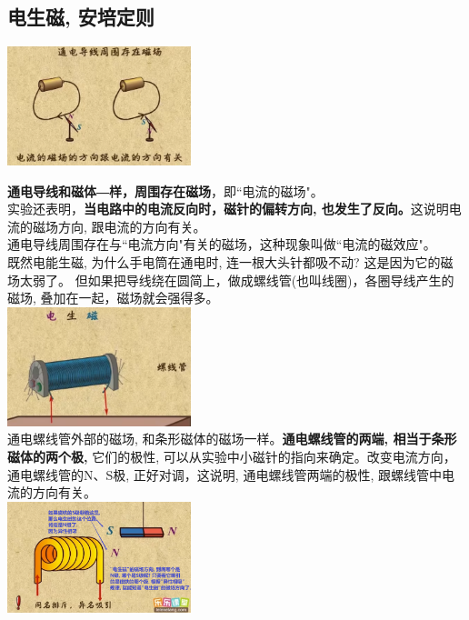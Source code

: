 \documentclass[UTF8]{ctexart}
\begin{document}
\vspace{1em} 

\subsection{电生磁, 安培定则} 

	\includegraphics[width=0.4\textwidth]{img/0081.png} 
	
\textbf{通电导线和磁体―样，周围存在磁场}，即``电流的磁场"。\\
实验还表明，\textbf{当电路中的电流反向时，磁针的偏转方向, 也发生了反向。}这说明电流的磁场方向, 跟电流的方向有关。\\
通电导线周围存在与``电流方向"有关的磁场，这种现象叫做``电流的磁效应"。 \\

既然电能生磁, 为什么手电筒在通电时, 连一根大头针都吸不动? 这是因为它的磁场太弱了。 但如果把导线绕在圆简上，做成螺线管(也叫线圈)，各圈导线产生的磁场, 叠加在一起，磁场就会强得多。 \\
	\includegraphics[width=0.4\textwidth]{img/0082.png}  \\
	

通电螺线管外部的磁场, 和条形磁体的磁场一样。\textbf{通电螺线管的两端, 相当于条形磁体的两个极,} 它们的极性, 可以从实验中小磁针的指向来确定。改变电流方向，通电螺线管的N、S极, 正好对调，这说明, 通电螺线管两端的极性, 跟螺线管中电流的方向有关。\\
		\includegraphics[width=0.4\textwidth]{img/0083.png} \\
		
\end{document}
